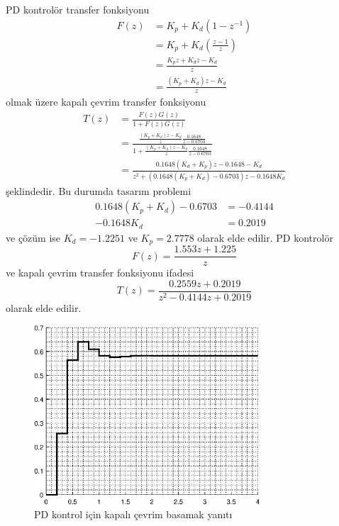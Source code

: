 PD kontrolör transfer fonksiyonu
\begin{equation}
\begin{split}
    F(z)&=K_p+K_d(1-z^{-1})\\
    &=K_p+K_d(\frac{z-1}{z})\\
    &=\frac{K_pz+K_dz-K_d}{z}\\
    &=\frac{(K_p+K_d)z-K_d}{z}
\end{split}
\end{equation}
olmak üzere kapalı çevrim transfer fonksiyonu
\begin{equation}
    \begin{split}
        T(z)&=\frac{F(z)G(z)}{1+F(z)G(z)}\\
        &=\frac{\frac{(K_p+K_d)z-K_d}{z}\frac{0.1648}{z-0.6703}}{1+\frac{(K_p+K_d)z-K_d}{z}\frac{0.1648}{z-0.6703}}\\
        &=\frac{0.1648(K_d+K_p)z-0.1648-K_d}{z^2+(0.1648(K_p+K_d)-0.6703)z-0.1648K_d}
    \end{split}
\end{equation}
şeklindedir. Bu durumda tasarım problemi
\begin{equation}
    \begin{split}
        0.1648(K_p+K_d)-0.6703&=-0.4144\\
        -0.1648K_d&=0.2019
    \end{split}
\end{equation}
ve çözüm ise $K_d=-1.2251$ ve $K_p=2.7778$ olarak elde edilir. PD kontrolör
\begin{equation}
    F(z)=\frac{1.553 z + 1.225}{z}
\end{equation}
ve kapalı çevrim transfer fonksiyonu ifadesi
\begin{equation}
    T(z)=\frac{0.2559 z + 0.2019}{z^2 - 0.4144 z + 0.2019}
\end{equation}
olarak elde edilir.
\begin{figure}[!htb]
    \centering
    \includegraphics[width=0.75\textwidth]{img/lec6_step2}
    \caption{PD kontrol için kapalı çevrim basamak yanıtı}
    \label{fig:lec6_step2}
\end{figure}

